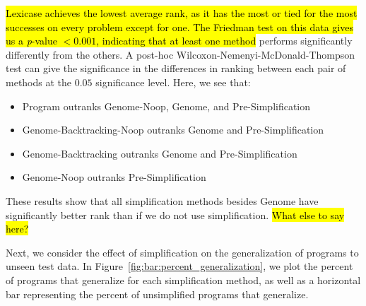 \hl{Lexicase achieves the lowest average rank, as it has the most or tied for the most successes on every problem except for one. The Friedman test on this data gives us a \textit{p}-value $< 0.001$, indicating that at least one method} performs significantly differently from the others. A post-hoc Wilcoxon-Nemenyi-McDonald-Thompson test \cite{hollander1999nonparametric} can give the significance in the differences in ranking between each pair of methods at the $0.05$ significance level. Here, we see that:
\begin{itemize}
\item Program outranks Genome-Noop, Genome, and Pre-Simplification
\item Genome-Backtracking-Noop outranks Genome and Pre-Simplification
\item Genome-Backtracking outranks Genome and Pre-Simplification
\item Genome-Noop outranks Pre-Simplification
\end{itemize}
These results show that all simplification methods besides Genome have significantly better rank than if we do not use simplification. \hl{What else to say here?}


Next, we consider the effect of simplification on the generalization of programs to unseen test data. In Figure~\ref{fig:bar:percent_generalization}, we plot the percent of programs that generalize for each simplification method, as well as a horizontal bar representing the percent of unsimplified programs that generalize.

